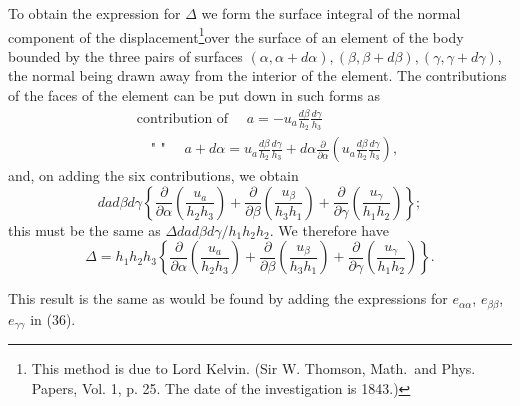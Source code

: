 To obtain the expression for \(\Delta \) we form the surface integral of
the normal component of the displacement\footnote{This method is due to Lord
Kelvin. (Sir W. Thomson, Math.\ and Phys.  Papers, Vol. 1, p. 25. The date of
the investigation is 1843.) }over the surface of an element of the body bounded
by the three pairs of surfaces
\((\alpha, \alpha+d \alpha),(\beta, \beta+d \beta),(\gamma, \gamma+d \gamma)\),
the normal being drawn away from the interior of the element. The
contributions of the faces of the element can be put down in such forms as
\[
\begin{aligned}
& \text { contribution of } \quad a=-u_a \frac{d \beta}{h_2} \frac{d \gamma}{h_3} \\
& \quad \text { " " } \quad a+d \alpha=u_a \frac{d \beta}{h_2}
\frac{d \gamma}{h_3}+d \alpha \frac{\partial}{\partial \alpha}\left(u_a \frac{d
\beta}{h_2} \frac{d \gamma}{h_3}\right),
\end{aligned}
\]
and, on adding the six contributions, we obtain
\[
d a d \beta d \gamma \left\{\frac{\partial}{\partial \alpha}
\left(\frac{u_a}{h_2 h_3}\right)+
\frac{\partial}{\partial \beta}\left(\frac{u_\beta}{h_3 h_1}\right)+
\frac{\partial}{\partial \gamma}\left(\frac{u_\gamma}{h_1 h_2}\right)\right\};
\]
this must be the same as \(\Delta d a d \beta d \gamma / h_1 h_2 h_2\).
We therefore have
\[
\Delta=h_1 h_2 h_3\left\{
\frac{\partial}{\partial \alpha}\left(\frac{u_a}{h_2 h_3}\right)+
\frac{\partial}{\partial \beta}\left(\frac{u_\beta}{h_3 h_1}\right)+
\frac{\partial}{\partial \gamma}\left(\frac{u_\gamma}{h_1 h_2}\right)
\right\}.
\]

This result is the same as would be found by adding the expressions for
\(e_{\alpha \alpha}\), \(e_{\beta \beta}\), \(e_{\gamma \gamma}\) in (36).
